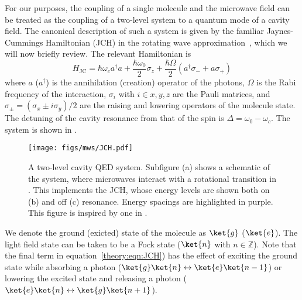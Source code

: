 For our purposes, the coupling of a single molecule and the microwave field can
be treated as the coupling of a two-level system to a quantum mode of a cavity
field. The canonical description of such a system is given by the familiar
Jaynes-Cummings Hamiltonian (JCH) in the rotating wave
approximation~\cite{gerry_knight_2004}, which we will now briefly review. The
relevant Hamiltonian is
%
\begin{equation}
  H_\text{JC} = \hbar\omega_c a^\dagger a + \frac{\hbar \omega_0}{2} \sigma_z +
  \frac{\hbar\Omega}{2}(a^\dagger \sigma_- + a\sigma_+)
  \label{theory:eqn:JCH}
\end{equation}
%
where $a$ ($a^\dagger$) is the annihilation (creation) operator of the photons,
$\Omega$ is the Rabi frequency of the interaction, $\sigma_i$ with $i\in{x, y,
z}$ are the Pauli matrices, and $\sigma_\pm = (\sigma_x \pm i\sigma_y)/2$ are
the raising and lowering operators of the molecule state. The detuning of the
cavity resonance from that of the spin is $\Delta = \omega_0 - \omega_c$. The
system is shown in .

\begin{figure}
  \texttt{[image: figs/mws/JCH.pdf]}
  \caption{A two-level cavity QED system. Subfigure (a) shows a schematic of
    the system, where microwaves interact with a rotational transition in
    \CaF{}. This implements the JCH, whose energy levels are shown both on (b)
    and off (c) resonance. Energy spacings are highlighted in purple. This
    figure is inspired by one in .
  }
  \label{theory:fig:JCHstates}
\end{figure}

We denote the ground (exicted) state of the molecule as $\ket{g}$ ($\ket{e}$).
The light field state can be taken to be a Fock state ($\ket{n}$ with $n \in
\mathbb{Z}$). Note that the final term in equation~\ref{theory:eqn:JCH}) has
the effect of exciting the ground state while absorbing a photon
($\ket{g}\ket{n} \leftrightarrow \ket{e}\ket{n-1}$) or lowering the excited state
and releasing a photon ($\ket{e}\ket{n} \leftrightarrow \ket{g}\ket{n+1}$).


